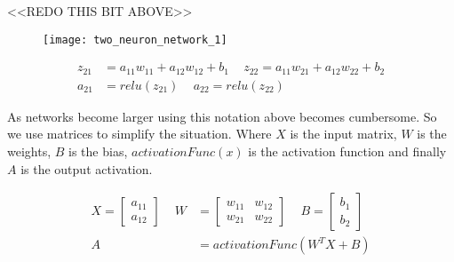 <<REDO THIS BIT ABOVE>>

\begin{figure}[h]
    \centering
    \texttt{[image: two\_neuron\_network\_1]}
\end{figure}

\begin{equation}
    \begin{aligned}
        z_{21} &= a_{11}w_{11} + a_{12}w_{12} + b_{1} \, \, \, \, \, \, \, z_{22} = a_{11}w_{21} + a_{12}w_{22} + b_{2} \\
        a_{21} &= relu(z_{21}) \, \, \, \, \, \, \, a_{22} = relu(z_{22}) 
    \end{aligned}
\end{equation}


As networks become larger using this notation above becomes cumbersome. So we
use matrices to simplify the situation. Where \(X\) is the input matrix, \(W\)
is the weights, \(B\) is the bias, \(activationFunc(x)\) is the activation function and finally \(A\) is the output activation.

\begin{equation}
    \begin{aligned}
        X = \begin{bmatrix}
            a_{11} \\
            a_{12}
        \end{bmatrix} \, \, \, \, \, \, \,
        W &= \begin{bmatrix}
            w_{11} & w_{12} \\
            w_{21} & w_{22}
        \end{bmatrix} \, \, \, \, \, \, \,
        B = \begin{bmatrix}
            b_{1} \\
            b_{2}
        \end{bmatrix} \\[10pt]
        A &= activationFunc( W^{T}X + B)
    \end{aligned}
\end{equation}

